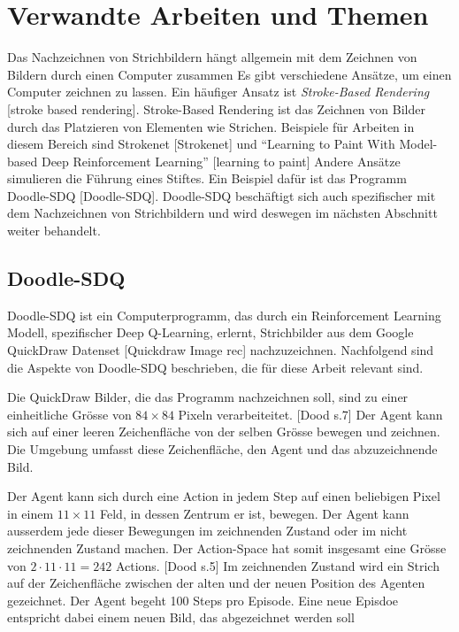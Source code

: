 \section{Verwandte Arbeiten und Themen}
\label{chap:t_verwandt}
Das Nachzeichnen von Strichbildern hängt allgemein mit dem Zeichnen von Bildern
durch einen Computer zusammen Es gibt verschiedene Ansätze, um einen Computer
zeichnen zu lassen. Ein häufiger Ansatz ist \emph{Stroke-Based Rendering}
[stroke based rendering]. Stroke-Based Rendering ist das Zeichnen von Bilder
durch das Platzieren von Elementen wie Strichen. Beispiele für Arbeiten in
diesem Bereich sind Strokenet [Strokenet] und ``Learning to Paint With
Model-based Deep Reinforcement Learning'' [learning to paint] Andere Ansätze
simulieren die Führung eines Stiftes. Ein Beispiel dafür ist das Programm
Doodle-SDQ [Doodle-SDQ]. Doodle-SDQ beschäftigt sich auch spezifischer mit dem
Nachzeichnen von Strichbildern und wird deswegen im nächsten Abschnitt weiter
behandelt.

\subsection{Doodle-SDQ}
Doodle-SDQ ist ein Computerprogramm, das durch ein Reinforcement Learning
Modell, spezifischer Deep Q-Learning, erlernt, Strichbilder aus dem Google
QuickDraw Datenset [Quickdraw Image rec] nachzuzeichnen. Nachfolgend sind die Aspekte von Doodle-SDQ
beschrieben, die für diese Arbeit relevant sind.

Die QuickDraw Bilder, die das Programm nachzeichnen soll, sind zu einer
einheitliche Grösse von $84\times84$ Pixeln verarbeiteitet. [Dood s.7] Der Agent kann sich
auf einer leeren Zeichenfläche von der selben Grösse bewegen und zeichnen. Die
Umgebung umfasst diese Zeichenfläche, den Agent und das abzuzeichnende Bild.

Der Agent kann sich durch eine Action in jedem Step auf einen beliebigen Pixel
in einem $11\times11$ Feld, in dessen Zentrum er ist, bewegen. Der Agent kann
ausserdem jede dieser Bewegungen im zeichnenden Zustand oder im nicht
zeichnenden Zustand machen. Der Action-Space hat somit insgesamt eine Grösse von
$2\cdot11\cdot11 = 242$ Actions. [Dood s.5] Im zeichnenden Zustand wird ein Strich auf der
Zeichenfläche zwischen der alten und der neuen Position des Agenten gezeichnet.
Der Agent begeht 100 Steps pro Episode. Eine neue Episdoe entspricht dabei einem
neuen Bild, das abgezeichnet werden soll

